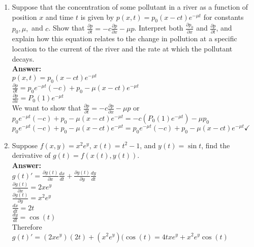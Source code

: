 \documentclass[11pt]{article}
\begin{document}
\begin{enumerate}
    
    \item Suppose that the concentration of some pollutant in a river as a function of position $x$ and time $t$ is given by $p(x,t) = p_0 (x-ct) e^{-\mu t}$ for constants $p_0, \mu,$ and  $c$.  Show that $\frac{\partial p}{\partial t} = -c \frac{\partial p}{\partial x} - \mu p$.  Interpret both $\frac{\partial p_0}{\partial x}$ and  $\frac{\partial p}{\partial t}$, and explain how this equation relates to the change in pollution at a specific location to the current of the river and the rate at which the pollutant decays.
    \\
    \textbf{Answer:}
    \\
     $p(x,t) = p_0 (x-ct) e^{-\mu t}$
     \\
     $\frac{\partial p}{\partial t}=p_0e^{-\mu t}(-c)+  p_0 -\mu (x-ct) e^{-\mu t}$
     \\
    $\frac{\partial p}{\partial x}=P_0(1)e^{-\mu t}   $
    \\
    We want to show that  $\frac{\partial p}{\partial t} = -c \frac{\partial p}{\partial x} - \mu p$ or $p_0e^{-\mu t}(-c)+  p_0 -\mu (x-ct) e^{-\mu t}=-c(P_0(1)e^{-\mu t})- \mu p_0$
    \\
    $p_0e^{-\mu t}(-c)+  p_0 -\mu (x-ct) e^{-\mu t}=p_0e^{-\mu t}(-c)+  p_0 -\mu (x-ct) e^{-\mu t} \checkmark$
    
    \item Suppose $f(x,y) = x^2 e^y$, $x(t) = t^2 - 1$, and $y(t) = \sin t$, find the derivative of $g(t) = f(x(t), y(t))$.
    \\
    \textbf{Answer:}
\\
$g(t)'=\frac{\partial g(t)}{\partial x} \frac{dx}{dt} + \frac{\partial g(t)}{\partial y} \frac{dy}{dt}$
\\
$\frac{\partial g(t)}{\partial x}= 2xe^y$
\\
$\frac{\partial g(t)}{\partial y}= x^2e^y$
\\
$\frac{dx}{dt}=2t$
\\
$\frac{dy}{dt}= \cos (t)$
\\
Therefore
\\
$g(t)'=(2xe^y)(2t)+(x^2e^y)(\cos (t)= 4txe^y+x^2e^y \cos (t)$





\end{enumerate}
\end{document}
